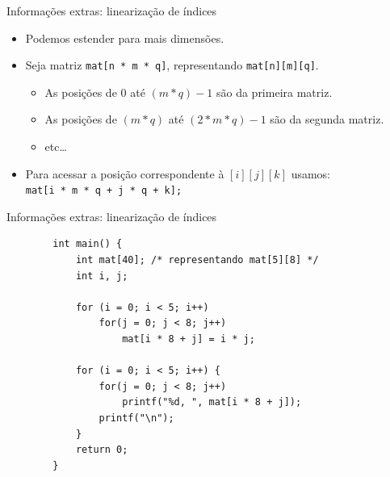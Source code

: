 \documentclass[handout]{beamer}
\newcommand{\cod}[1]{\texttt{#1}}
\begin{document}
\begin{frame}[fragile]{Informações extras: linearização de índices}

    \begin{itemize}
        \item Podemos estender para mais dimensões.
        \item Seja matriz \cod{mat[n * m * q]}, representando \cod{mat[n][m][q]}.
        \begin{itemize}
            \item As posições de 0 até $(m * q) - 1$ são da primeira matriz.
            \item As posições de $(m * q)$ até $(2 * m * q) - 1$ são da segunda matriz.
            \item etc\ldots
        \end{itemize}
        \item Para acessar a posição correspondente à $[i][j][k]$ usamos:\\
            \cod{mat[i * m * q + j * q + k];}
    \end{itemize}

\end{frame}

\begin{frame}[fragile]{Informações extras: linearização de índices}

    \begin{verbatim}
        int main() {
            int mat[40]; /* representando mat[5][8] */
            int i, j;

            for (i = 0; i < 5; i++)
                for(j = 0; j < 8; j++)
                    mat[i * 8 + j] = i * j;

            for (i = 0; i < 5; i++) {
                for(j = 0; j < 8; j++)
                    printf("%d, ", mat[i * 8 + j]);
                printf("\n");
            }
            return 0;
        }
    \end{verbatim}

\end{frame}

\end{document}
